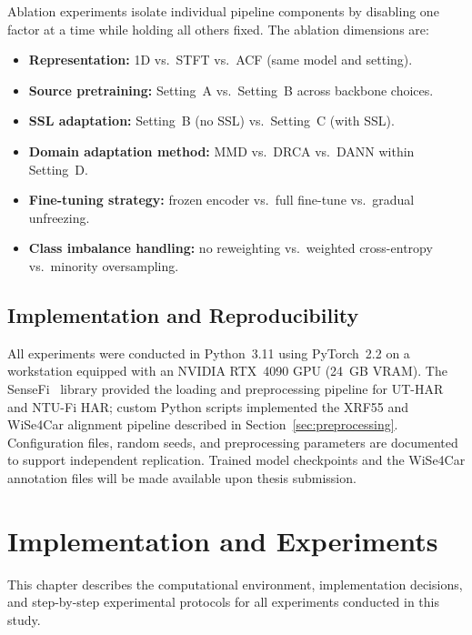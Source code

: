 \documentclass[english,bibtex]{kththesis}
\begin{document}
Ablation experiments isolate individual pipeline components by disabling one factor at a time while holding all others fixed. The ablation dimensions are:

\begin{itemize}
  \item \textbf{Representation:} 1D vs.\ STFT vs.\ ACF (same model and setting).
  \item \textbf{Source pretraining:} Setting~A vs.\ Setting~B across backbone choices.
  \item \textbf{SSL adaptation:} Setting~B (no SSL) vs.\ Setting~C (with SSL).
  \item \textbf{Domain adaptation method:} MMD vs.\ DRCA vs.\ DANN within Setting~D.
  \item \textbf{Fine-tuning strategy:} frozen encoder vs.\ full fine-tune vs.\ gradual unfreezing.
  \item \textbf{Class imbalance handling:} no reweighting vs.\ weighted cross-entropy vs.\ minority oversampling.
\end{itemize}

\section{Implementation and Reproducibility}
\label{sec:implementation}

%
All experiments were conducted in Python~3.11 using PyTorch~2.2 on a workstation equipped with an NVIDIA RTX~4090 GPU (24~GB VRAM). The SenseFi~\cite{yang2023sensefi} library provided the loading and preprocessing pipeline for UT-HAR and NTU-Fi HAR; custom Python scripts implemented the XRF55 and WiSe4Car alignment pipeline described in Section~\ref{sec:preprocessing}. Configuration files, random seeds, and preprocessing parameters are documented to support independent replication. Trained model checkpoints and the WiSe4Car annotation files will be made available upon thesis submission.

\cleardoublepage

\chapter{Implementation and Experiments}
\label{ch:whatYouDid}

This chapter describes the computational environment, implementation decisions, and step-by-step experimental protocols for all experiments conducted in this study.
\end{document}
